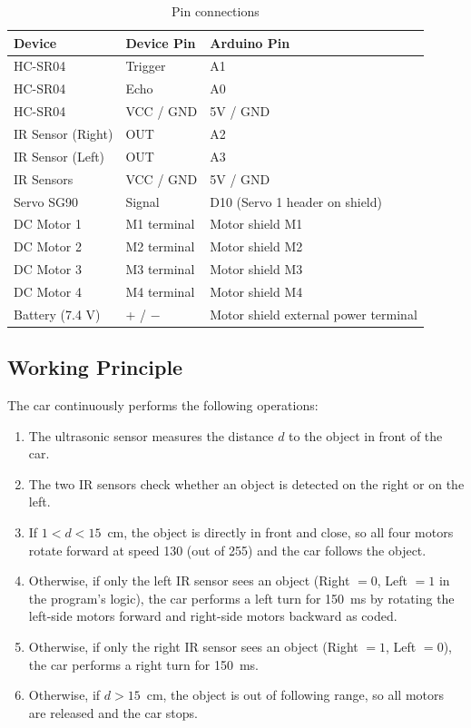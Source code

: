 \documentclass[12pt,a4paper]{article}
\begin{document}
\begin{table}[h]
\centering
\caption{Pin connections}
\label{tab:pins}
\begin{tabular}{@{}lll@{}}
\toprule
\textbf{Device} & \textbf{Device Pin} & \textbf{Arduino Pin} \\
\midrule
HC-SR04 & Trigger & A1 \\
HC-SR04 & Echo & A0 \\
HC-SR04 & VCC / GND & 5V / GND \\
IR Sensor (Right) & OUT & A2 \\
IR Sensor (Left) & OUT & A3 \\
IR Sensors & VCC / GND & 5V / GND \\
Servo SG90 & Signal & D10 (Servo 1 header on shield) \\
DC Motor 1 & M1 terminal & Motor shield M1 \\
DC Motor 2 & M2 terminal & Motor shield M2 \\
DC Motor 3 & M3 terminal & Motor shield M3 \\
DC Motor 4 & M4 terminal & Motor shield M4 \\
Battery (7.4 V) & + / $-$ & Motor shield external power terminal \\
\bottomrule
\end{tabular}
\end{table}

\subsection{Working Principle}
The car continuously performs the following operations:
\begin{enumerate}
  \item The ultrasonic sensor measures the distance $d$ to the object in front of the car.
  \item The two IR sensors check whether an object is detected on the right or on the left.
  \item If $1 < d < 15$~cm, the object is directly in front and close, so all four motors rotate forward at speed 130 (out of 255) and the car follows the object.
  \item Otherwise, if only the left IR sensor sees an object (Right $=0$, Left $=1$ in the program's logic), the car performs a left turn for 150~ms by rotating the left-side motors forward and right-side motors backward as coded.
  \item Otherwise, if only the right IR sensor sees an object (Right $=1$, Left $=0$), the car performs a right turn for 150~ms.
  \item Otherwise, if $d > 15$~cm, the object is out of following range, so all motors are released and the car stops.
\end{enumerate}
\end{document}
